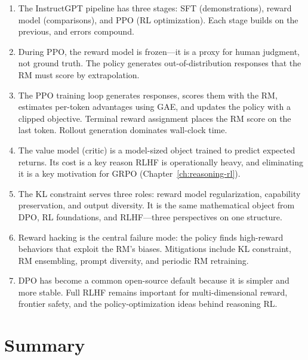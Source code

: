 \begin{takeaways}
\begin{enumerate}
  \item The InstructGPT pipeline has three stages: SFT (demonstrations), reward model (comparisons), and PPO (RL optimization). Each stage builds on the previous, and errors compound.
  \item During PPO, the reward model is frozen---it is a proxy for human judgment, not ground truth. The policy generates out-of-distribution responses that the RM must score by extrapolation.
  \item The PPO training loop generates responses, scores them with the RM, estimates per-token advantages using GAE, and updates the policy with a clipped objective. Terminal reward assignment places the RM score on the last token. Rollout generation dominates wall-clock time.
  \item The value model (critic) is a model-sized object trained to predict expected returns. Its cost is a key reason RLHF is operationally heavy, and eliminating it is a key motivation for GRPO (Chapter~\ref{ch:reasoning-rl}).
  \item The KL constraint serves three roles: reward model regularization, capability preservation, and output diversity. It is the same mathematical object from DPO, RL foundations, and RLHF---three perspectives on one structure.
  \item Reward hacking is the central failure mode: the policy finds high-reward behaviors that exploit the RM's biases. Mitigations include KL constraint, RM ensembling, prompt diversity, and periodic RM retraining.
  \item DPO has become a common open-source default because it is simpler and more stable. Full RLHF remains important for multi-dimensional reward, frontier safety, and the policy-optimization ideas behind reasoning RL.
\end{enumerate}
\end{takeaways}


\section*{Summary}

